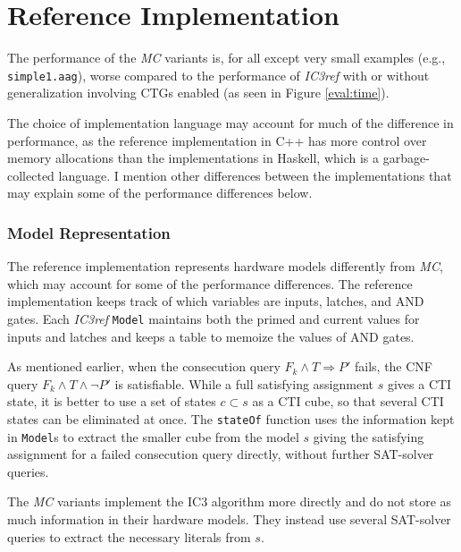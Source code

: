 \documentclass[12pt,a4paper,twoside,openright]{report}
\begin{document}
{{\section{Reference Implementation}
\label{eval:ic3ref}

The performance of the \emph{MC} variants is, for all except very small examples
(e.g., \verb,simple1.aag,),
worse compared to the performance of \emph{IC3ref}
with or without generalization involving CTGs enabled (as seen in Figure \ref{eval:time}).

The choice of implementation language may account for much of the difference in performance, as the reference
implementation in C++ has more control over memory allocations than the implementations in Haskell, which is
a garbage-collected language. I mention other differences between the implementations that may explain
some of the performance differences below.

\subsubsection{Model Representation}
\label{eval:ic3ref:model}
The reference implementation represents hardware models differently from
\emph{MC}, which may account for some of the performance differences.
The reference implementation keeps track of which variables are inputs, latches, and AND gates.
Each \emph{IC3ref} \verb,Model, maintains both the primed and current values for inputs and latches and keeps a
table to memoize the values of AND gates.

As mentioned earlier, when the consecution query $F_k \wedge T \Rightarrow P'$ fails, 
the CNF query $F_k \wedge T \wedge \neg P'$ is satisfiable.
While a full satisfying assignment
$s$ gives a CTI state, it is better to use a set of states $c \subset s$ as a CTI cube, so that several
CTI states can be eliminated at once.
The \verb,stateOf, function uses the information kept in \verb,Model,s to extract the smaller
cube from the model $s$ giving the satisfying assignment for a failed consecution query directly,
without further SAT-solver queries.

The \emph{MC} variants implement the IC3 algorithm more directly and do not store as
much information in their hardware
models. They instead use several SAT-solver queries to extract the necessary literals
from $s$.

}}
\end{document}
